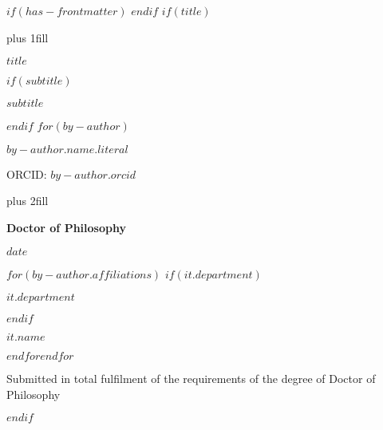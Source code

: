 $if(has-frontmatter)$
\frontmatter
$endif$
$if(title)$
\cleardoublepage
\thispagestyle{empty}
{\centering
\hbox{}\vskip 0cm plus 1fill
{\Huge\bfseries $title$ \par}
$if(subtitle)$
\vspace{3ex}
{\Large\bfseries $subtitle$ \par}
$endif$
\vspace{12ex}
$for(by-author)$
{\Large\bfseries $by-author.name.literal$ \par}
\vspace{3ex}
{\Large ORCID: $by-author.orcid$ \par}
\vskip 0cm plus 2fill
{\bfseries\large Doctor of Philosophy \par}
\vspace{3ex}
{\bfseries\large $date$ \par}
\vspace{12ex}
$for(by-author.affiliations)$%
$if(it.department)$%
{\bfseries\large $it.department$ \par}
\vspace{3ex}
$endif$%
{\bfseries\large $it.name$ \par}
$endfor$$endfor$%
\vspace{12ex}
{\small Submitted in total fulfilment of the requirements
of the degree of Doctor of Philosophy \par}
}
$endif$